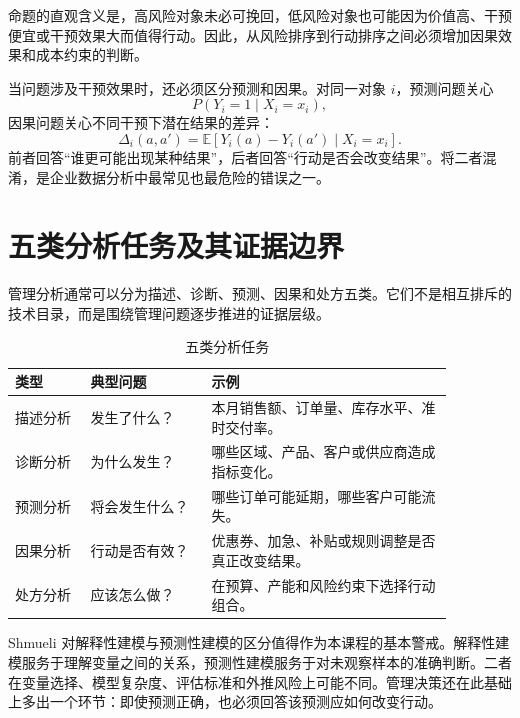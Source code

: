 \documentclass[UTF8,fontset=fandol,openany,zihao=-4]{ctexbook}
\begin{document}
\begin{remark}
命题的直观含义是，高风险对象未必可挽回，低风险对象也可能因为价值高、干预便宜或干预效果大而值得行动。因此，从风险排序到行动排序之间必须增加因果效果和成本约束的判断。
\end{remark}

当问题涉及干预效果时，还必须区分预测和因果。对同一对象 \(i\)，预测问题关心
\[
P(Y_i=1\mid X_i=x_i),
\]
因果问题关心不同干预下潜在结果的差异：
\[
\Delta_i(a,a')
=
\mathbb E\!\left[Y_i(a)-Y_i(a')\mid X_i=x_i\right].
\]
前者回答“谁更可能出现某种结果”，后者回答“行动是否会改变结果”。将二者混淆，是企业数据分析中最常见也最危险的错误之一。

\section{五类分析任务及其证据边界}

管理分析通常可以分为描述、诊断、预测、因果和处方五类。它们不是相互排斥的技术目录，而是围绕管理问题逐步推进的证据层级。

\begin{table}[htbp]
\centering
\caption{五类分析任务}
\begin{tabular}{p{0.15\linewidth}p{0.24\linewidth}p{0.48\linewidth}}
\toprule
类型 & 典型问题 & 示例\\
\midrule
描述分析 & 发生了什么？ & 本月销售额、订单量、库存水平、准时交付率。\\
诊断分析 & 为什么发生？ & 哪些区域、产品、客户或供应商造成指标变化。\\
预测分析 & 将会发生什么？ & 哪些订单可能延期，哪些客户可能流失。\\
因果分析 & 行动是否有效？ & 优惠券、加急、补贴或规则调整是否真正改变结果。\\
处方分析 & 应该怎么做？ & 在预算、产能和风险约束下选择行动组合。\\
\bottomrule
\end{tabular}
\end{table}

Shmueli 对解释性建模与预测性建模的区分值得作为本课程的基本警戒。解释性建模服务于理解变量之间的关系，预测性建模服务于对未观察样本的准确判断。二者在变量选择、模型复杂度、评估标准和外推风险上可能不同。管理决策还在此基础上多出一个环节：即使预测正确，也必须回答该预测应如何改变行动。
\end{document}
